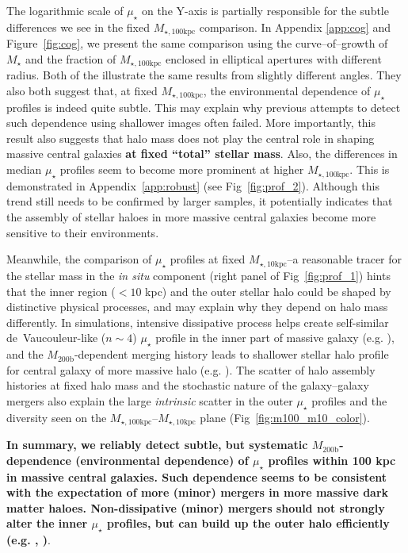 \documentclass[a4paper,fleqn,usenatbib]{mnras}
\def\mstar{{$M_{\star}$}}
\def\mhalo{{$M_{\mathrm{200b}}$}}
\def\minn{{$M_{\star,10\mathrm{kpc}}$}}
\def\mtot{{$M_{\star,100\mathrm{kpc}}$}}
\def\mden{{$\mu_{\star}$}}
\begin{document}
    The logarithmic scale of \mden{} on the Y-axis is partially responsible for the 
    subtle differences we see in the fixed \mtot{} comparison.  
    In Appendix \ref{app:cog} and Figure~\ref{fig:cog}, we present the same 
    comparison using the curve--of--growth of \mstar{} and the fraction of \mtot{} 
    enclosed in elliptical apertures with different radius. 
    Both of the illustrate the same results from slightly different angles. 
    They also both suggest that, at fixed \mtot{}, the environmental dependence of 
    \mden{} profiles is indeed quite subtle. 
    This may explain why previous attempts to detect such dependence using shallower 
    images often failed. 
    More importantly, this result also suggests that halo mass does not play the 
    central role in shaping massive central galaxies \textbf{at fixed ``total'' 
    stellar mass}.
    Also, the differences in median \mden{} profiles seem to become more prominent 
    at higher \mtot{}. 
    This is demonstrated in Appendix~\ref{app:robust} (see Fig~\ref{fig:prof_2}). 
    Although this trend still needs to be confirmed by larger samples, it 
    potentially indicates that the assembly of stellar haloes in more massive 
    central galaxies become more sensitive to their environments.   
     
    Meanwhile, the comparison of \mden{} profiles at fixed \minn{}--a reasonable 
    tracer for the stellar mass in the \textit{in situ} component (right panel of 
    Fig~\ref{fig:prof_1}) hints that the inner region ($<10$ kpc) and the outer 
    stellar halo could be shaped by distinctive physical processes, and may explain 
    why they depend on halo mass differently.  
    In simulations, intensive dissipative process helps create 
    self-similar de~Vaucouleur-like ($n{\sim} 4$) \mden{} profile in the inner part 
    of massive galaxy (e.g. \citealt{Hopkins2008}), and the \mhalo{}-dependent
    merging history leads to shallower stellar halo profile for central galaxy 
    of more massive halo (e.g. \citealt{Pillepich2014}). 
    The scatter of halo assembly histories at fixed halo mass and the stochastic 
    nature of the galaxy--galaxy mergers also explain the large \textit{intrinsic} 
    scatter in the outer \mden{} profiles and the diversity seen on the 
    \mtot{}--\minn{} plane (Fig~\ref{fig:m100_m10_color}).

    \textbf{In summary, we reliably detect subtle, but systematic \mhalo{}-dependence 
    (environmental dependence) of \mden{} profiles within 100 kpc in massive central 
    galaxies. 
    Such dependence seems to be consistent with the expectation of more (minor) 
    mergers in more massive dark matter haloes. 
    Non-dissipative (minor) mergers should not strongly alter the inner \mden{} 
    profiles, but can build up the outer halo efficiently
    (e.g. \citealt{Hilz2013}, \citealt{Oogi2013})}.
      
\end{document}
